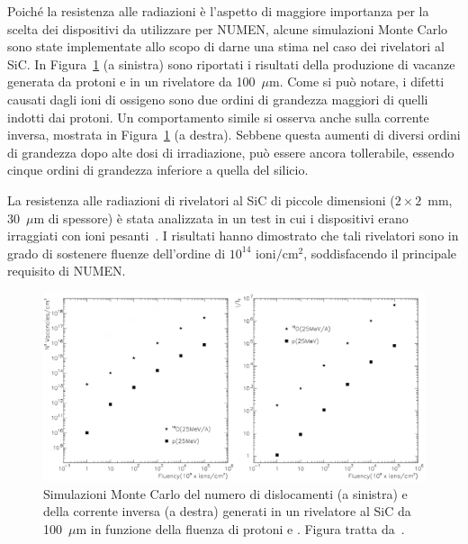 Poiché la resistenza alle radiazioni è l'aspetto di maggiore importanza per la scelta dei dispositivi da utilizzare per NUMEN, alcune simulazioni Monte Carlo sono state implementate allo scopo di darne una stima nel caso dei rivelatori al SiC. 
In Figura~\ref{fig:sic_simul_resist_radiaz} (a sinistra) sono riportati i risultati della produzione di vacanze generata da protoni e  in un rivelatore da 100~$\mu$m.
Come si può notare, i difetti causati dagli ioni di ossigeno sono due ordini di grandezza maggiori di quelli indotti dai protoni.
Un comportamento simile si osserva anche sulla corrente inversa, mostrata in Figura~\ref{fig:sic_simul_resist_radiaz} (a destra). Sebbene questa aumenti di diversi ordini di grandezza dopo alte dosi di irradiazione, può essere ancora tollerabile, essendo cinque ordini di grandezza inferiore a quella del silicio.

La resistenza alle radiazioni di rivelatori al SiC di piccole dimensioni ($2 \times 2$~mm, 30~$\mu$m di spessore) è stata analizzata in un test in cui i dispositivi erano irraggiati con ioni pesanti~\cite{raciti:npa10}. 
I risultati hanno dimostrato che tali rivelatori sono in grado di sostenere fluenze dell'ordine di $10^{14}$  $\mbox{ioni}/\mbox{cm}^2$, soddisfacendo il principale requisito di NUMEN.

\begin{figure} [!t]
	\centering
	\includegraphics[width=\textwidth, keepaspectratio]{Grafici/sic_simul_resist_radiaz.png}
	\caption{ Simulazioni Monte Carlo del numero di dislocamenti (a sinistra) e della corrente inversa (a destra) generati in un rivelatore al SiC da 100~$\mu$m in funzione della fluenza di protoni e . Figura tratta da~\cite{cappuzzello:epja18}.} \label{fig:sic_simul_resist_radiaz}
\end{figure}



